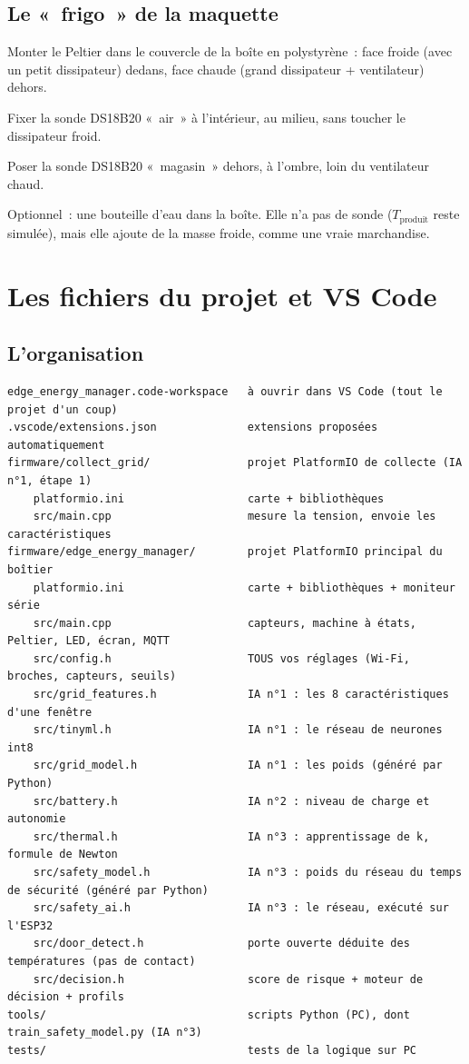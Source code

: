 \subsection{Le «~frigo~» de la maquette}
\begin{steps}
  \item Monter le Peltier dans le couvercle de la boîte en polystyrène~: face froide (avec un petit dissipateur) dedans, face chaude (grand dissipateur + ventilateur) dehors.
  \item Fixer la sonde DS18B20 «~air~» à l'intérieur, au milieu, sans toucher le dissipateur froid.
  \item Poser la sonde DS18B20 «~magasin~» dehors, à l'ombre, loin du ventilateur chaud.
  \item Optionnel~: une bouteille d'eau dans la boîte. Elle n'a pas de sonde ($T_{\text{produit}}$ reste simulée), mais elle ajoute de la masse froide, comme une vraie marchandise.
\end{steps}

\section{Les fichiers du projet et VS Code}\label{sec:fichiers}

\subsection{L'organisation}
\begin{lstlisting}[style=cmd]
edge_energy_manager.code-workspace   à ouvrir dans VS Code (tout le projet d'un coup)
.vscode/extensions.json              extensions proposées automatiquement
firmware/collect_grid/               projet PlatformIO de collecte (IA n°1, étape 1)
    platformio.ini                   carte + bibliothèques
    src/main.cpp                     mesure la tension, envoie les caractéristiques
firmware/edge_energy_manager/        projet PlatformIO principal du boîtier
    platformio.ini                   carte + bibliothèques + moniteur série
    src/main.cpp                     capteurs, machine à états, Peltier, LED, écran, MQTT
    src/config.h                     TOUS vos réglages (Wi-Fi, broches, capteurs, seuils)
    src/grid_features.h              IA n°1 : les 8 caractéristiques d'une fenêtre
    src/tinyml.h                     IA n°1 : le réseau de neurones int8
    src/grid_model.h                 IA n°1 : les poids (généré par Python)
    src/battery.h                    IA n°2 : niveau de charge et autonomie
    src/thermal.h                    IA n°3 : apprentissage de k, formule de Newton
    src/safety_model.h               IA n°3 : poids du réseau du temps de sécurité (généré par Python)
    src/safety_ai.h                  IA n°3 : le réseau, exécuté sur l'ESP32
    src/door_detect.h                porte ouverte déduite des températures (pas de contact)
    src/decision.h                   score de risque + moteur de décision + profils
tools/                               scripts Python (PC), dont train_safety_model.py (IA n°3)
tests/                               tests de la logique sur PC
\end{lstlisting}

